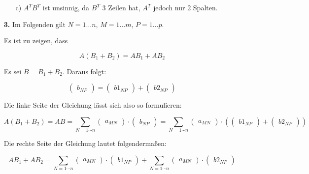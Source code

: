 \documentclass[a4paper,10pt]{scrartcl}
\begin{document}
\begin{enumerate}
\begin{enumerate}
            \item[c)]
                $A^TB^T$ ist unsinnig, da $B^T$ 3 Zeilen hat, $A^T$ jedoch nur 2 Spalten.
        \end{enumerate}

    \item[\textbf{3.}]
        Im Folgenden gilt $N = 1 \dots n$, $M = 1 \dots m$, $P = 1 \dots p$.

        Es ist zu zeigen, dass

        $$A(B_1 + B_2) = AB_1 + AB_2$$

        Es sei $B = B_1 + B_2$. Daraus folgt:

        $$
            \begin{pmatrix}b_{NP}\end{pmatrix} =
            \begin{pmatrix}b1_{NP}\end{pmatrix} +
            \begin{pmatrix}b2_{NP}\end{pmatrix}
        $$

        Die linke Seite der Gleichung lässt sich also so formulieren:

        $$
            A(B_1 + B_2) = AB =
            \sum_{N = 1 \cdots n}
            \begin{pmatrix}a_{MN}\end{pmatrix} \cdot
            \begin{pmatrix}b_{NP}\end{pmatrix} =
            \sum_{N = 1 \cdots n}
            \begin{pmatrix}a_{MN}\end{pmatrix} \cdot \left(
            \begin{pmatrix}b1_{NP}\end{pmatrix} +
            \begin{pmatrix}b2_{NP}\end{pmatrix} \right)
        $$

        Die rechte Seite der Gleichung lautet folgendermaßen:

        $$
            AB_1 + AB_2 =
            \sum_{N = 1 \cdots n}
            \begin{pmatrix}a_{MN}\end{pmatrix} \cdot
            \begin{pmatrix}b1_{NP}\end{pmatrix} +
            \sum_{N = 1 \cdots n}
            \begin{pmatrix}a_{MN}\end{pmatrix} \cdot
            \begin{pmatrix}b2_{NP}\end{pmatrix}
        $$


\end{enumerate}
\end{document}

